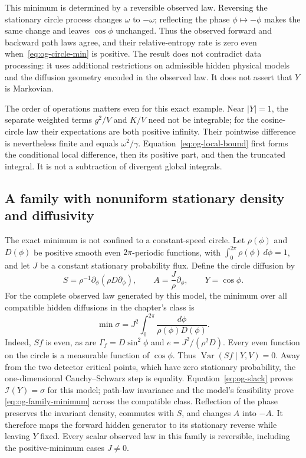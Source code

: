 This minimum is determined by a reversible observed law. Reversing the
stationary circle process changes $\omega$ to $-\omega$; reflecting the
phase $\phi\mapsto-\phi$ makes the same change and leaves $\cos\phi$
unchanged. Thus the observed forward and backward path laws agree, and their
relative-entropy rate is zero even when~\eqref{eq:og-circle-min} is positive.
The result does not contradict data processing: it uses additional
restrictions on admissible hidden physical models and the diffusion geometry
encoded in the observed law. It does not assert that $Y$ is Markovian.

The order of operations matters even for this exact example. Near
$|Y|=1$, the separate weighted terms $g^2/V$ and $K/V$ need not be
integrable; for the cosine-circle law their expectations are both positive
infinity. Their pointwise difference is nevertheless finite and equals
$\omega^2/\gamma$. Equation~\eqref{eq:og-local-bound} first forms the
conditional local difference, then its positive part, and then the
truncated integral. It is not a subtraction of divergent global integrals.

\subsection{A family with nonuniform stationary density and diffusivity}

The exact minimum is not confined to a constant-speed circle. Let
$\rho(\phi)$ and $D(\phi)$ be positive smooth even $2\pi$-periodic
functions, with $\int_0^{2\pi}\rho(\phi)\,d\phi=1$, and let $J$ be a
constant stationary probability flux. Define the circle diffusion by
\begin{equation}
 S=\rho^{-1}\partial_\phi(\rho D\partial_\phi),\qquad
 A=\frac{J}{\rho}\partial_\phi,
 \qquad Y=\cos\phi.
 \label{eq:og-symmetric-circle-family}
\end{equation}
For the complete observed law generated by this model, the minimum over all
compatible hidden diffusions in the chapter's class is
\begin{equation}
 \min\sigma
 =J^2\int_0^{2\pi}\frac{d\phi}{\rho(\phi)D(\phi)}.
 \label{eq:og-family-minimum}
\end{equation}
Indeed, $Sf$ is even, as are $\Gamma_f=D\sin^2\phi$ and
$e=J^2/(\rho^2D)$. Every even function on the circle is a measurable
function of $\cos\phi$. Thus $\operatorname{Var}(Sf\mid Y,V)=0$.
Away from the two detector critical points, which have zero stationary
probability, the one-dimensional Cauchy--Schwarz step is equality.
Equation~\eqref{eq:og-slack} proves $\mathcal I(Y)=\sigma$ for this model;
path-law invariance and the model's feasibility prove
\eqref{eq:og-family-minimum} across the compatible class. Reflection of the
phase preserves the invariant density, commutes with $S$, and changes $A$
into $-A$. It therefore maps the forward hidden generator to its stationary
reverse while leaving $Y$ fixed. Every scalar observed law in this family
is reversible, including the positive-minimum cases $J\ne0$.

